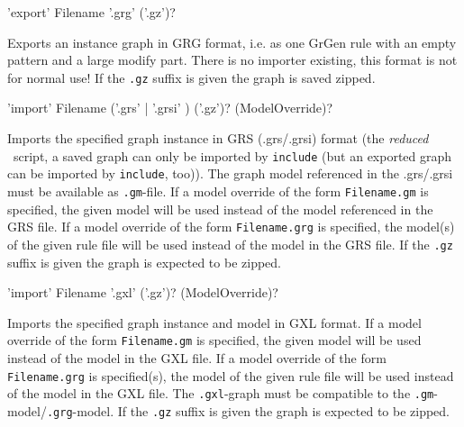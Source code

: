 \begin{rail}
  'export' Filename '.grg' ('.gz')?
\end{rail}
Exports an instance graph in GRG format, i.e. as one GrGen rule with an empty pattern and a large modify part.
There is no importer existing, this format is not for normal use!
If the \texttt{.gz} suffix is given the graph is saved zipped.

\pagebreak %

\begin{rail}
  'import' Filename ('.grs' | '.grsi' ) ('.gz')? (ModelOverride)?
\end{rail}
Imports the specified graph instance in GRS (.grs/.grsi) format (the \emph{reduced} \GrShell\ script,
a saved graph can only be imported by \texttt{include} (but an exported graph can be imported by \texttt{include}, too)).
The graph model referenced in the .grs/.grsi must be available as \texttt{.gm}-file.
If a model override of the form \texttt{Filename.gm} is specified, the given model will be used instead of the model referenced in the GRS file.
If a model override of the form \texttt{Filename.grg} is specified, the model(s) of the given rule file will be used instead of the model in the GRS file.
If the \texttt{.gz} suffix is given the graph is expected to be zipped.

\begin{rail}
  'import' Filename '.gxl' ('.gz')? (ModelOverride)?
\end{rail}
Imports the specified graph instance and model in GXL format.
If a model override of the form \texttt{Filename.gm} is specified, the given model will be used instead of the model in the GXL file.
If a model override of the form \texttt{Filename.grg} is specified(s), the model of the given rule file will be used instead of the model in the GXL file.
The \texttt{.gxl}-graph must be compatible to the \texttt{.gm}-model/\texttt{.grg}-model.
If the \texttt{.gz} suffix is given the graph is expected to be zipped.

